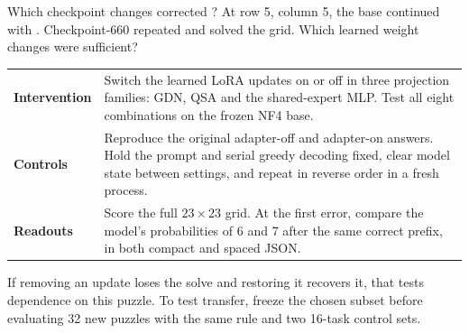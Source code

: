 \begin{frame}[t]{Which checkpoint changes corrected ?}
\normbody
At row 5, column 5, the base continued  with . Checkpoint-660 repeated  and solved the grid. Which learned weight changes were sufficient?
\par\vspace{4mm}
\med\begin{tabular}{@{}>{\raggedright\arraybackslash\bfseries}p{34mm}>{\raggedright\arraybackslash}p{174mm}@{}}
Intervention & Switch the learned LoRA updates on or off in three projection families: GDN, QSA and the shared-expert MLP. Test all eight combinations on the frozen NF4 base.\\[2mm]
Controls & Reproduce the original adapter-off and adapter-on answers. Hold the prompt and serial greedy decoding fixed, clear model state between settings, and repeat in reverse order in a fresh process.\\[2mm]
Readouts & Score the full $23\times23$ grid. At the first error, compare the model's probabilities of 6 and 7 after the same correct prefix, in both compact and spaced JSON.\\
\end{tabular}
\vfill
\smallbody If removing an update loses the solve and restoring it recovers it, that tests dependence on this puzzle. To test transfer, freeze the chosen subset before evaluating 32 new puzzles with the same rule and two 16-task control sets.
\end{frame}

